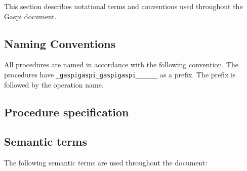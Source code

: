 \documentclass[a4paper]{article}
\makeatletter
\newcommand{\zerowsep}{\hskip 0pt plus 0.1pt minus 0.1pt}
\newcommand{\ZSEP}[1]{\ifx#1\@@@EOZ@@@\let\next\relax\else\ifx#1\_#1\zerowsep\else#1\fi\let\next\ZSEP\fi\next}
\newcommand{\zsep}[1]{\ZSEP{}#1\@@@EOZ@@@}
\newcommand{\gaspiprefix}{gaspi}
\newcommand{\GASPI}{{\sc Gaspi}}
\newcommand{\function}[1]{{\tt #1}}
\newcommand{\gaspifunction}[1]{\function{\protect\zsep{\gaspiprefix\_#1}}}
\makeatother
\begin{document}
This section describes notational terms and conventions used throughout the \GASPI{}
document.


\subsection{Naming Conventions}

All procedures are named in accordance with the following convention.
The procedures have \gaspifunction{} as a prefix. The prefix
is followed by the operation name.


\subsection{Procedure specification}

\subsection{Semantic terms}

The following semantic terms are used throughout the document:

\newcommand{\septext}{0.5em}
\newcommand{\gentextwithline}[6]{
\draw (#2,#3) node[left] {#1};
\draw[#6] (#2+\septext+#4,#3) -- +(#5,0);
}
\newcommand{\timeline}[1]{\gentextwithline{Time}{0}{#1}{0}{25em}{->,dashed}}
\newcommand{\operation}[2]{\gentextwithline{Operation}{0}{#1}{1em}{#2}{|-|}}
\newcommand{\gencall}[3]{\gentextwithline{#1}{0}{#2}{0}{#3}{|-|}}
\newcommand{\call}[2]{\gencall{Call}{#1}{#2}}
\newcommand{\calls}[2]{\gencall{Calls}{#1}{#2-10em};
\draw[|-|] (#2-8em,#1) -- +(8em,0);
}
\newcommand{\wait}[3]{\gentextwithline{Wait}{#1}{#2}{0}{#3}{|-|}}
\newcommand{\progress}[2]{\gentextwithline{Progress}{0}{#1}{1em}{#2}{|-|}}
\end{document}
